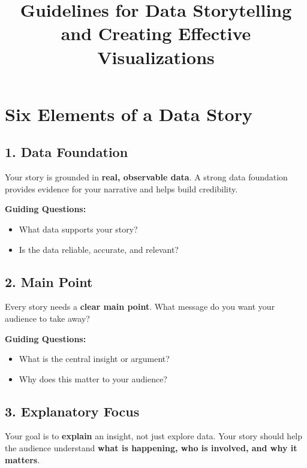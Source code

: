 \documentclass[
  11pt,
]{article}
\title{Guidelines for Data Storytelling and Creating Effective
Visualizations}
\author{}
\date{\vspace{-2.5em}}
\providecommand{\tightlist}{%
  \setlength{\itemsep}{0pt}\setlength{\parskip}{0pt}}
\begin{document}
\maketitle

\section{Six Elements of a Data
Story}\label{six-elements-of-a-data-story}

\subsection{\texorpdfstring{\textbf{1. Data
Foundation}}{1. Data Foundation}}\label{data-foundation}

Your story is grounded in \textbf{real, observable data}. A strong data
foundation provides evidence for your narrative and helps build
credibility.

\textbf{Guiding Questions:}

\begin{itemize}
\tightlist
\item
  What data supports your story?
\item
  Is the data reliable, accurate, and relevant?
\end{itemize}

\subsection{\texorpdfstring{\textbf{2. Main
Point}}{2. Main Point}}\label{main-point}

Every story needs a \textbf{clear main point}. What message do you want
your audience to take away?

\textbf{Guiding Questions:}

\begin{itemize}
\tightlist
\item
  What is the central insight or argument?
\item
  Why does this matter to your audience?
\end{itemize}

\subsection{\texorpdfstring{\textbf{3. Explanatory
Focus}}{3. Explanatory Focus}}\label{explanatory-focus}

Your goal is to \textbf{explain} an insight, not just explore data. Your
story should help the audience understand \textbf{what is happening, who
is involved, and why it matters}.
\end{document}

